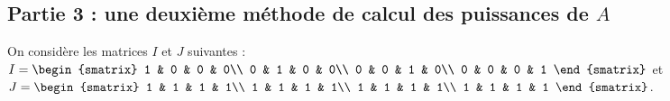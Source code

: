 \subsection*{Partie 3 : une deuxième méthode de calcul des puissances
  de $A$}

\noindent
On considère les matrices $I$ et $J$ suivantes : $I =
\begin{smatrix}
  1 & 0 & 0 & 0\\
  0 & 1 & 0 & 0\\
  0 & 0 & 1 & 0\\
  0 & 0 & 0 & 1
\end{smatrix}
$ et $J = 
\begin{smatrix}
  1 & 1 & 1 & 1\\
  1 & 1 & 1 & 1\\
  1 & 1 & 1 & 1\\
  1 & 1 & 1 & 1
\end{smatrix}
$.
